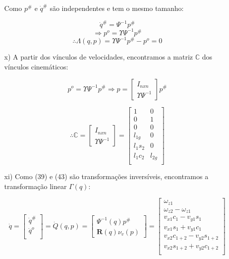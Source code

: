 \begin{itemize}
\begin{itemize}
	Como $p^{\#}$ e $\dot{q}^{\#}$ são independentes e tem o mesmo tamanho:

	$$ \dot{q}^{\#} = \Psi^{-1} p^{\#} $$
	$$ \Rightarrow  p^o = \Upsilon \Psi^{-1} p^{\#} $$
	\begin{equation}
	\therefore \Lambda(q,p) =  \Upsilon \Psi^{-1} p^{\#} - p^o  = 0
	\end{equation}
	
	\item[x)] A partir dos v\'inculos de velocidades, encontramos a matriz $\mathbb{C}$ dos v\'inculos cinem\'aticos:
	
	$$ p^o = \Upsilon \Psi^{-1} p^{\#} \Rightarrow p =
	\begin{bmatrix}
	I_{nxn}\\
	\Upsilon \Psi^{-1}
	\end{bmatrix}
	p^{\#}
	$$
	
	\begin{equation}
	\therefore \mathbb{C} =
	\begin{bmatrix}
	I_{nxn}\\
	\Upsilon \Psi^{-1}
	\end{bmatrix}
	=
	\begin{bmatrix}
	1 & 0 \\
	0 & 1 \\
	0 & 0 \\
	l_{1g} & 0\\
	l_1 s_{2} & 0 \\
	l_1 c_{2} & l_{2g} \\
	\end{bmatrix}
	\end{equation}
	
	\item[xi)] Como (39) e (43) são transforma\c{c}\~oes invers\'iveis, encontramos a transforma\c{c}\~ao linear $\Gamma(q)$:
	
	\begin{equation}
	\dot{q} =
	\begin{bmatrix}
	\dot{q}^{\#} \\
	\dot{q}^o \\
	\end{bmatrix}
	= \dot{Q}(q,p) =
	\begin{bmatrix}
	\Psi^{-1} (q) p^{\#} \\
	\mathbf{R} (q) \nu_v (p)
	\end{bmatrix}
	=
	\begin{bmatrix}
	\omega_{z1} \\
	\omega_{z2}-\omega_{z1}\\
	v_{x1} c_1 - v_{y1} s_1 \\
	v_{x1} s_1 + v_{y1} c_1 \\
	v_{x2} c_{1+2} - v_{y2} s_{1+2} \\
	v_{x2} s_{1+2} + v_{y2} c_{1+2} \\
	\end{bmatrix}
	\end{equation}
	

\end{itemize}
\end{itemize}
